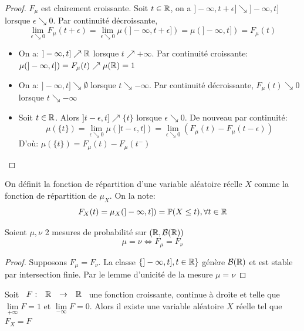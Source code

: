 \documentclass[]{report}
\begin{document}
    \begin{proof}
        $F_\mu$ est clairement croissante. Soit $t\in \mathbb{R}$, on a $]-\infty,t+\epsilon]\searrow]-\infty,t]$ lorsque $\epsilon\searrow 0$. Par continuité décroissante,
        \[\underset{\epsilon\searrow 0}{\lim} F_\mu(t+\epsilon)=\underset{\epsilon\searrow 0}{\lim} \mu(]-\infty,t+\epsilon])=\mu(]-\infty,t])=F_\mu(t)\]
        \begin{itemize}
            \item On a: $]-\infty,t]\nearrow\mathbb{R}$ lorsque $t\nearrow+\infty$. Par continuité croissante: $\mu(]-\infty,t])=F_\mu(t)\nearrow \mu(\mathbb{R})=1$
            \item On a: $]-\infty,t]\searrow\emptyset$ lorsque $t\searrow-\infty$. Par continuité décroissante, $F_\mu(t)\searrow 0$ lorsque $t\searrow-\infty$
            \item Soit $t\in \mathbb{R}$. Alors $]t-\epsilon,t]\nearrow\{t\}$ lorsque $\epsilon\searrow 0$. De nouveau par continuité:\\
            \[\mu(\{t\})=\underset{\epsilon\searrow 0}{\lim}\mu(]t-\epsilon,t])=\underset{\epsilon\searrow 0}{\lim} (F_\mu(t)-F_\mu(t-\epsilon))\]
            D'où: $\mu(\{t\})=F_\mu(t)-F_\mu(t^-)$
        \end{itemize}
    \end{proof}

    \begin{df}{}{}
        On définit la fonction de répartition d'une variable aléatoire réelle $X$ comme la fonction de répartition de $\mu_X$. On la note:
        \[F_X(t)=\mu_X(]-\infty,t])=\mathbb{P}(X\le t),\forall t\in \mathbb{R}\]
    \end{df}

    \begin{prop}{}{}
        Soient $\mu,\nu$ 2 mesures de probabilité sur $(\mathbb{R},\mathcal{B}(\mathbb{R}))$
        \[\mu=\nu\iff F_\mu=F_\nu\]
    \end{prop}

    \begin{proof}
        Supposons $F_\mu=F_\nu$. La classe $\{]-\infty,t],t\in \mathbb{R}\}$ génère $\mathcal{B}(\mathbb{R})$ et est stable par intersection finie. Par le lemme d'unicité de la mesure $\mu=\nu$
    \end{proof}

    \begin{prop}{}{}
        Soit $\begin{array}{ccccc} F : & \mathbb{R} & \to & \mathbb{R} \end{array}$ une fonction croissante, continue à droite et telle que $\underset{+\infty}{\lim}F=1$ et $\underset{-\infty}{\lim}F=0$. Alors il existe une variable aléatoire $X$ réelle tel que $F_X=F$
    \end{prop}
\end{document}
